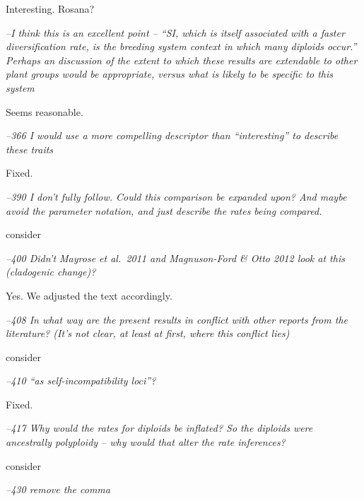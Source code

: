 \documentclass[11pt]{article}
\renewenvironment{quote}{\bigskip\noindent\itshape\ignorespaces}{\smallskip}
\begin{document}
Interesting. Rosana? %

\begin{quote}
--I think this is an excellent point -- ``SI, which is itself associated with a faster diversification rate, is the breeding system context in which many diploids occur.''
Perhaps an discussion of the extent to which these results are extendable to other plant groups would be appropriate, versus what is likely to be specific to this system
\end{quote}

Seems reasonable. %

\begin{quote}
--366  I would use a more compelling descriptor than ``interesting'' to describe these traits
\end{quote}

Fixed.

\begin{quote}
--390  I don't fully follow.
Could this comparison be expanded upon?
And maybe avoid the parameter notation, and just describe the rates being compared.
\end{quote}

consider %

\begin{quote}
--400  Didn't Mayrose et al.\ 2011 and Magnuson-Ford \& Otto 2012 look at this (cladogenic change)?
\end{quote}

Yes.
We adjusted the text accordingly.

\begin{quote}
--408  In what way are the present results in conflict with other reports from the literature?
(It's not clear, at least at first, where this conflict lies)
\end{quote}

consider %

\begin{quote}
--410  ``as self-incompatibility loci''?
\end{quote}

Fixed.

\begin{quote}
--417  Why would the rates for diploids be inflated?
So the diploids were ancestrally polyploidy -- why would that alter the rate inferences?
\end{quote}

consider %

\begin{quote}
--430  remove the comma
\end{quote}
\end{document}
